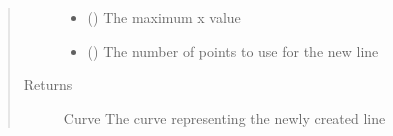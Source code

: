 \documentclass[letterpaper,10pt,english]{sphinxmanual}
\begin{document}
\begin{fulllineitems}
\begin{quote}
\begin{description}
\begin{itemize}
\item {} 
 () \textendash{} The maximum x value

\item {} 
 () \textendash{} The number of points to use for the new line

\end{itemize}

\item[{Returns}] \leavevmode
Curve \textendash{} The curve representing the newly created line

\end{description}\end{quote}

\end{fulllineitems}

\end{document}
